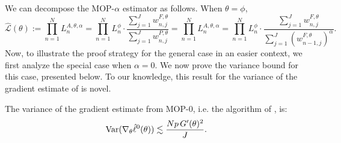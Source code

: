 We can decompose the MOP-$\alpha$ estimator as follows. 
When $\theta=\phi$,
\begin{equation}
\hat{\mathcal{L}}(\theta):=\prod_{n=1}^N L_n^{A, \theta, \alpha}=\prod_{n=1}^N L_n^\phi \cdot \frac{\sum_{j=1}^J w_{n, j}^{F, \theta}}{\sum_{j=1}^J w_{n, j}^{P, \theta}}=\prod_{n=1}^N L_n^{A, \theta, \alpha}=\prod_{n=1}^N L_n^\phi \cdot \frac{\sum_{j=1}^J w_{n, j}^{F, \theta}}{\sum_{j=1}^J (w_{n-1, j}^{F, \theta})^\alpha}.
\end{equation}
Now, to illustrate the proof strategy for the general case in an easier context, we first analyze the special case when $\alpha=0.$ We now prove the variance bound for this case, presented below. To our knowledge, this result for the variance of the gradient estimate of \cite{naesseth18} is novel. 

\begin{thm}
The variance of the gradient estimate from MOP-$0$, i.e. the algorithm of \cite{naesseth18}, is:
 \begin{equation}
     \mathrm{Var}(\nabla_\theta \hat\ell^0(\theta)) \lesssim \frac{Np \, G'(\theta)^2}{J}.
 \end{equation}
\end{thm}

